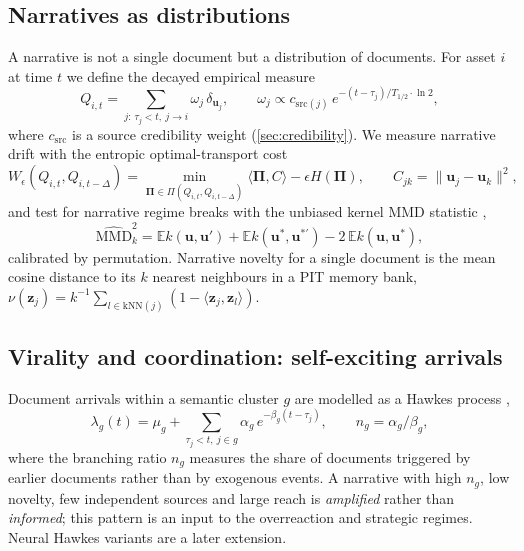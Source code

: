 \documentclass[11pt,a4paper]{article}
\theoremstyle{plain}
\theoremstyle{definition}
\theoremstyle{remark}
\newcommand{\E}{\mathbb{E}}
\newcommand{\z}{\bm{z}}
\begin{document}
\subsection{Narratives as distributions}
A narrative is not a single document but a distribution of documents. For asset $i$ at time $t$ we define the decayed empirical measure
\begin{equation}
  Q_{i,t} = \sum_{j:\,\tau_j<t,\ j\to i} \omega_j\,\delta_{\bm u_j},\qquad
  \omega_j\propto c_{\mathrm{src}(j)}\,e^{-(t-\tau_j)/T_{1/2}\cdot\ln 2},
\end{equation}
where $c_{\mathrm{src}}$ is a source credibility weight (\cref{sec:credibility}). We measure narrative drift with the entropic optimal-transport cost \citep{cuturi2013}
\begin{equation}
  W_\epsilon(Q_{i,t},Q_{i,t-\Delta}) = \min_{\bm\Pi\in\Pi(Q_{i,t},Q_{i,t-\Delta})}\langle\bm\Pi,C\rangle-\epsilon H(\bm\Pi),\qquad C_{jk}=\|\bm u_j-\bm u_k\|^2,
\end{equation}
and test for narrative regime breaks with the unbiased kernel MMD statistic \citep{gretton2012},
\begin{equation}
  \widehat{\mathrm{MMD}}^2_k = \E k(\bm u,\bm u')+\E k(\bm u^\ast,\bm u^{\ast\prime})-2\,\E k(\bm u,\bm u^\ast),
\end{equation}
calibrated by permutation. Narrative novelty for a single document is the mean cosine distance to its $k$ nearest neighbours in a PIT memory bank, $\nu(\z_j)=k^{-1}\sum_{l\in\mathrm{kNN}(j)}(1-\langle\z_j,\z_l\rangle)$.

\subsection{Virality and coordination: self-exciting arrivals}
Document arrivals within a semantic cluster $g$ are modelled as a Hawkes process \citep{hawkes1971,bacry2015},
\begin{equation}
  \lambda_g(t)=\mu_g+\sum_{\tau_j<t,\ j\in g}\alpha_g\, e^{-\beta_g(t-\tau_j)},\qquad n_g=\alpha_g/\beta_g,
\end{equation}
where the branching ratio $n_g$ measures the share of documents triggered by earlier documents rather than by exogenous events. A narrative with high $n_g$, low novelty, few independent sources and large reach is \emph{amplified} rather than \emph{informed}; this pattern is an input to the overreaction and strategic regimes. Neural Hawkes variants \citep{mei2017} are a later extension.
\end{document}
